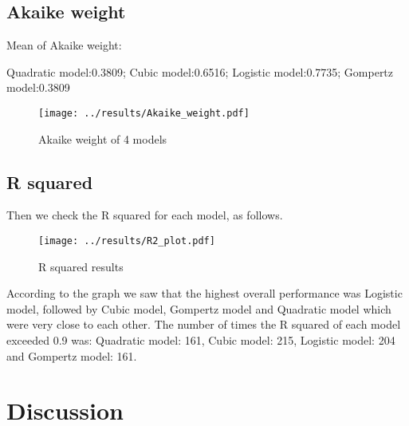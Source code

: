 \documentclass[11pt]{article}
\begin{document}
\begin{linenumbers}
      \newpage
      \subsection{Akaike weight}

    Mean of Akaike weight:

    Quadratic model:0.3809;  Cubic model:0.6516;  Logistic model:0.7735; Gompertz model:0.3809  

      \begin{figure}[H]
        \centering
        \texttt{[image: ../results/Akaike\_weight.pdf]}
        \caption{Akaike weight of 4 models}
      \end{figure}
     
      \subsection{R squared}

    Then we check the R squared for each model, as follows.

      \begin{figure}[H]
        \centering
        \texttt{[image: ../results/R2\_plot.pdf]}
        \caption{R squared results}
      \end{figure}

    According to the graph we saw that the highest overall performance was Logistic model, followed by Cubic model, Gompertz model and Quadratic model which were very close to each other. The number of times the R squared of each model exceeded 0.9 was: Quadratic model: 161, Cubic model: 215, Logistic model: 204 and Gompertz model: 161.
      
      \section{Discussion}
      

\end{linenumbers}
\end{document}
